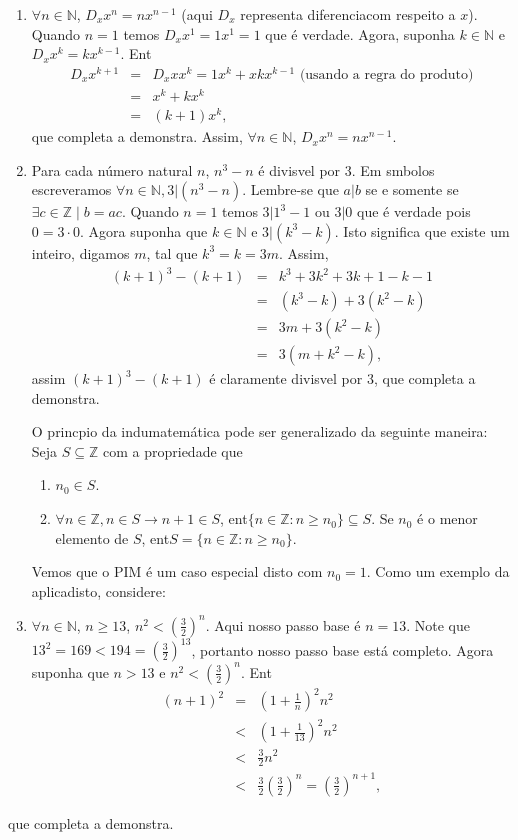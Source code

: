 \begin{enumerate}[{\bf 1.}]
\item $\forall n\in\mathbb{N}$, $D_x x^n=nx^{n-1}$ (aqui $D_x$ representa diferencia\cao com respeito a $x$). Quando $n=1$ temos $D_x x^1=1x^{1}=1$ que \'e verdade. Agora, suponha $k\in\mathbb{N}$ e $D_x x^k=kx^{k-1}$. Ent\ao
\begin{eqnarray*}
D_x x^{k+1}&=& D_x x x^{k} = 1x^{k}+xkx^{k-1} \textrm{ (usando a regra do produto)}\\
           &=& x^{k}+kx^{k}\\
           &=& (k+1)x^{k},
\end{eqnarray*}  
que completa a demonstra\caoi. Assim, $\forall n\in\mathbb{N}$, $D_x x^n=nx^{n-1}$.

\item Para cada n\'umero natural $n$, $n^3-n$ \'e divis\ih vel por $3$. Em s\ih mbolos escrever\ih amos $\forall n\in\mathbb{N}, 3|(n^3-n)$. Lembre-se que $a|b$ se e somente se $\exists c\in\mathbb{Z}\mid  b=ac$. Quando $n=1$ temos $3|1^3-1$ ou $3|0$ que \'e verdade pois $0=3\cdot 0$. Agora suponha que $k\in\mathbb{N}$ e $3|(k^3-k)$. Isto significa que existe um inteiro, digamos $m$, tal que $k^3=k=3m$. Assim,
\begin{eqnarray*}
(k+1)^3-(k+1)&=& k^3+3k^2+3k+1-k-1\\
&=& (k^3-k)+3(k^2-k)\\
&=& 3m+3(k^2-k)\\
&=& 3(m+k^2-k),
\end{eqnarray*}
assim $(k+1)^3-(k+1)$ \'e claramente divis\ih vel por $3$, que completa a demonstra\caoi.

O princ\ih pio da indu\cao matem\'atica pode ser generalizado da seguinte maneira: Seja $S\subseteq\mathbb{Z}$ com a propriedade que
\begin{enumerate}[{\bf a)}]
\item $n_0\in S$.
\item $\forall n\in \mathbb{Z}, n\in S \rightarrow n+1\in S$, ent\ao $\{n\in\mathbb{Z}:n\geq n_0\}\subseteq S$. Se $n_0$ \'e o menor elemento de $S$, ent\ao $S=\{n\in\mathbb{Z}:n\geq n_0\}$. 
\end{enumerate}

Vemos que o PIM \'e um caso especial disto com $n_0=1$. Como um exemplo da aplica\cao disto, considere:

\item $\forall n\in\mathbb{N}$, $n\geq 13$, $n^2<(\frac{3}{2})^n$. Aqui nosso passo base \'e $n=13$. Note que $13^2=169<194=(\frac{3}{2})^{13}$, portanto nosso passo base est\'a completo. Agora suponha que $n>13$ e $n^2<(\frac{3}{2})^n$. Ent\ao
\begin{eqnarray*}
(n+1)^2&=& \left(1+\frac{1}{n}\right)^2n^2\\
&<& \left(1+\frac{1}{13}\right)^2n^2\\
&<& \frac{3}{2}n^2\\
&<& \frac{3}{2}\left(\frac{3}{2}\right)^n=\left(\frac{3}{2}\right)^{n+1},
\end{eqnarray*}
\end{enumerate}
que completa a demonstra\caoi.

